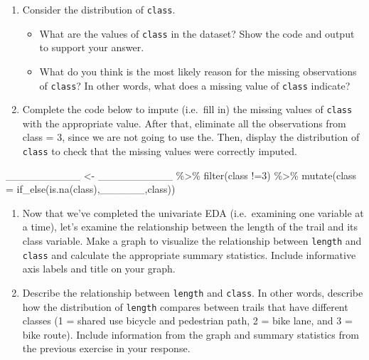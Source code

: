 \documentclass[
]{article}
\newenvironment{Shaded}{\begin{snugshade}}{\end{snugshade}}
\newcommand{\AttributeTok}[1]{\textcolor[rgb]{0.77,0.63,0.00}{#1}}
\newcommand{\DecValTok}[1]{\textcolor[rgb]{0.00,0.00,0.81}{#1}}
\newcommand{\FunctionTok}[1]{\textcolor[rgb]{0.00,0.00,0.00}{#1}}
\newcommand{\NormalTok}[1]{#1}
\newcommand{\OtherTok}[1]{\textcolor[rgb]{0.56,0.35,0.01}{#1}}
\newcommand{\SpecialCharTok}[1]{\textcolor[rgb]{0.00,0.00,0.00}{#1}}
\providecommand{\tightlist}{%
  \setlength{\itemsep}{0pt}\setlength{\parskip}{0pt}}
\begin{document}
\begin{enumerate}
\def\labelenumi{\arabic{enumi}.}
\setcounter{enumi}{7}
\tightlist
\item
  Consider the distribution of \texttt{class}.

  \begin{itemize}
  \tightlist
  \item
    What are the values of \texttt{class} in the dataset? Show the code
    and output to support your answer.
  \item
    What do you think is the most likely reason for the missing
    observations of \texttt{class}? In other words, what does a missing
    value of \texttt{class} indicate?
  \end{itemize}
\item
  Complete the code below to impute (i.e.~fill in) the missing values of
  \texttt{class} with the appropriate value. After that, eliminate all
  the observations from class = 3, since we are not going to use the.
  Then, display the distribution of \texttt{class} to check that the
  missing values were correctly imputed.
\end{enumerate}

\begin{Shaded}
\begin{Highlighting}[]
\NormalTok{\_\_\_\_\_\_\_\_\_\_ }\OtherTok{\textless{}{-}}\NormalTok{ \_\_\_\_\_\_\_\_\_\_ }\SpecialCharTok{\%\textgreater{}\%} \FunctionTok{filter}\NormalTok{(class }\SpecialCharTok{!=}\DecValTok{3}\NormalTok{) }\SpecialCharTok{\%\textgreater{}\%} 
  \FunctionTok{mutate}\NormalTok{(}\AttributeTok{class =} \FunctionTok{if\_else}\NormalTok{(}\FunctionTok{is.na}\NormalTok{(class),\_\_\_\_\_\_,class)) }
\end{Highlighting}
\end{Shaded}

\begin{enumerate}
\def\labelenumi{\arabic{enumi}.}
\setcounter{enumi}{9}
\item
  Now that we've completed the univariate EDA (i.e.~examining one
  variable at a time), let's examine the relationship between the length
  of the trail and its class variable. Make a graph to visualize the
  relationship between \texttt{length} and \texttt{class} and calculate
  the appropriate summary statistics. Include informative axis labels
  and title on your graph.
\item
  Describe the relationship between \texttt{length} and \texttt{class}.
  In other words, describe how the distribution of \texttt{length}
  compares between trails that have different classes (1 = shared use
  bicycle and pedestrian path, 2 = bike lane, and 3 = bike route).
  Include information from the graph and summary statistics from the
  previous exercise in your response.
\end{enumerate}
\end{document}
